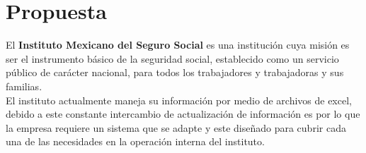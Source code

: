 \chapter{Propuesta}
\label{cap:Propuesta}
El \textbf{Instituto Mexicano del Seguro Social} es una institución cuya misión es ser el instrumento básico de la seguridad social, establecido como un servicio público de carácter nacional, para todos los trabajadores y trabajadoras y sus familias.\\

El instituto actualmente maneja su información por medio de archivos de excel, debido a este constante intercambio de actualización de información es por lo que la empresa requiere un sistema que se adapte y este diseñado para cubrir cada una de las necesidades en la operación interna del instituto.




